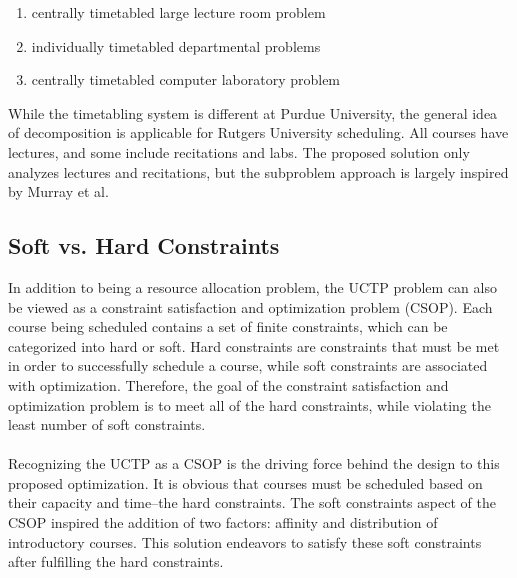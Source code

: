 \documentclass[12pt]{article}
\begin{document}
\begin{enumerate}
	\item centrally timetabled large lecture room problem
	\item individually timetabled departmental problems
	\item centrally timetabled computer laboratory problem
\end{enumerate}

While the timetabling system is different at Purdue University, the general
idea of decomposition is applicable for Rutgers University scheduling. All
courses have lectures, and some include recitations and labs. The proposed
solution only analyzes lectures and recitations, but the subproblem approach is
largely inspired by Murray et al.

\subsection{Soft vs. Hard Constraints}
In addition to being a resource allocation problem, the UCTP problem can also
be viewed as a constraint satisfaction and optimization problem (CSOP). Each
course being scheduled contains a set of finite constraints, which can be
categorized into hard or soft. Hard constraints are constraints that must be
met in order to successfully schedule a course, while soft constraints are
associated with optimization. Therefore, the goal of the constraint
satisfaction and optimization problem is to meet all of the hard constraints,
while violating the least number of soft constraints.
\\\\
Recognizing the UCTP as a CSOP is the driving force behind the design to this
proposed optimization. It is obvious that courses must be scheduled based on
their capacity and time--the hard constraints. The soft constraints aspect of
the CSOP inspired the addition of two factors: affinity and distribution of
introductory courses. This solution endeavors to satisfy these soft constraints
after fulfilling the hard constraints.
\end{document}
